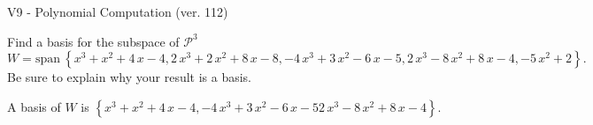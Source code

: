 \begin{exercise}
  \begin{exerciseTitle}V9 - Polynomial Computation (ver. 112)\end{exerciseTitle}
  \begin{exerciseStatement}
    Find a basis for the subspace of \(\mathcal{P}^3\) 
\[W=\mathrm{span}\ \left\{x^{3} + x^{2} + 4 \, x - 4 , 2 \, x^{3} + 2 \, x^{2} + 8 \, x - 8 , -4 \, x^{3} + 3 \, x^{2} - 6 \, x - 5 , 2 \, x^{3} - 8 \, x^{2} + 8 \, x - 4 , -5 \, x^{2} + 2\right\}.\]
 Be sure to explain why your result is a basis.


  \end{exerciseStatement}
  \begin{exerciseAnswer}
   A basis of \(W\) is  \(\left\{x^{3} + x^{2} + 4 \, x - 4 , -4 \, x^{3} + 3 \, x^{2} - 6 \, x - 5 2 \, x^{3} - 8 \, x^{2} + 8 \, x - 4\right\}\).
  


  \end{exerciseAnswer}
\end{exercise}